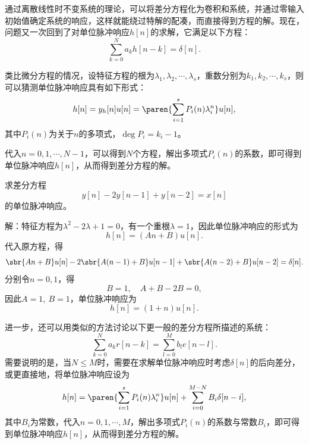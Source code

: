 通过离散线性时不变系统的理论，可以将差分方程化为卷积和系统，并通过零输入初始值确定系统的响应，这样就能绕过特解的配凑，而直接得到方程的解。现在，问题又一次回到了对单位脉冲响应$h[n]$的求解，它满足以下方程：
\begin{equation}
    \sum_{k=0}^{N}a_k h[n-k]=\delta[n].
\end{equation}

类比微分方程的情况，设特征方程的根为$\lambda_1,\lambda_2,\cdots,\lambda_s$，重数分别为$k_1,k_2,\cdots,k_s$，则可以猜测单位脉冲响应具有如下形式：
\begin{equation}
    h[n]=y_h[n]u[n]=\paren{\sum_{i=1}^{s}P_i(n) \lambda_i^n}u[n],
\end{equation}
其中$P_i(n)$为关于$n$的多项式，$\deg P_i=k_i-1$。

代入$n=0,1,\cdots,N-1$，可以得到$N$个方程，解出多项式$P_i(n)$的系数，即可得到单位脉冲响应$h[n]$，从而得到差分方程的解。

\begin{example}
    求差分方程
    \begin{equation}
        y[n]-2y[n-1]+y[n-2]=x[n]
    \end{equation}
    的单位脉冲响应。

    解：特征方程为$\lambda^2-2\lambda+1=0$，有一个重根$\lambda=1$，因此单位脉冲响应的形式为
    \begin{equation}
        h[n]=(A n+B)u[n].
    \end{equation}
    代入原方程，得
    \begin{equation}
        \sbr{An+B}u[n]-2\sbr{A(n-1)+B}u[n-1]+\sbr{A(n-2)+B}u[n-2]=\delta[n].
    \end{equation}
    分别令$n=0,1$，得
    \begin{equation}
        B=1,\quad A+B-2B=0,
    \end{equation}
    因此$A=1,\ B=1$，单位脉冲响应为
    \begin{equation}
        h[n]=(1+n)u[n].
    \end{equation}
\end{example}

进一步，还可以用类似的方法讨论以下更一般的差分方程所描述的系统：
\begin{equation}
    \sum_{k=0}^{N}a_k r[n-k]=\sum_{l=0}^{M}b_l e[n-l].
\end{equation}
需要说明的是，当$N\leq M$时，需要在求解单位脉冲响应时考虑$\delta[n]$的后向差分，或更直接地，将单位脉冲响应设为
\begin{equation}
    h[n]=\paren{\sum_{i=1}^{s}P_i(n) \lambda_i^n}u[n]+\sum_{i=0}^{M-N}B_i\delta[n-i],
\end{equation}
其中$B_i$为常数，代入$n=0,1,\cdots,M$，解出多项式$P_i(n)$的系数与常数$B_i$，即可得到单位脉冲响应$h[n]$，从而得到差分方程的解。


